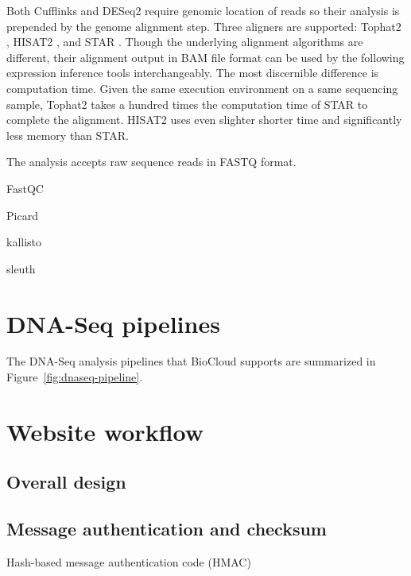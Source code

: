 Both Cufflinks and DESeq2 require genomic location of reads so their analysis
is prepended by the genome alignment step. Three aligners are supported:
Tophat2 \cite{kim2013:tophat2}, HISAT2 \cite{kim2015:hisat}, and STAR
\cite{dobin2013:star}. Though the underlying alignment algorithms are
different, their alignment output in BAM file format can be used by the
following expression inference tools interchangeably. The most discernible
difference is computation time. Given the same execution environment on a same
sequencing sample, Tophat2 takes a hundred times the computation time of STAR
to complete the alignment. HISAT2 uses even slighter shorter time and
significantly less memory than STAR.



The analysis accepts raw sequence reads in
FASTQ format.



FastQC \cite{:fastqc}






Picard \cite{:picard}


kallisto \cite{bray2016:nearoptimal}

sleuth \cite{pimentel2016:differential}


\section{DNA-Seq pipelines}

The DNA-Seq analysis pipelines that BioCloud supports are summarized in
Figure~\ref{fig:dnaseq-pipeline}.





\section{Website workflow}



\subsection{Overall design}

\subsection{Message authentication and checksum}

Hash-based message authentication code (HMAC)

